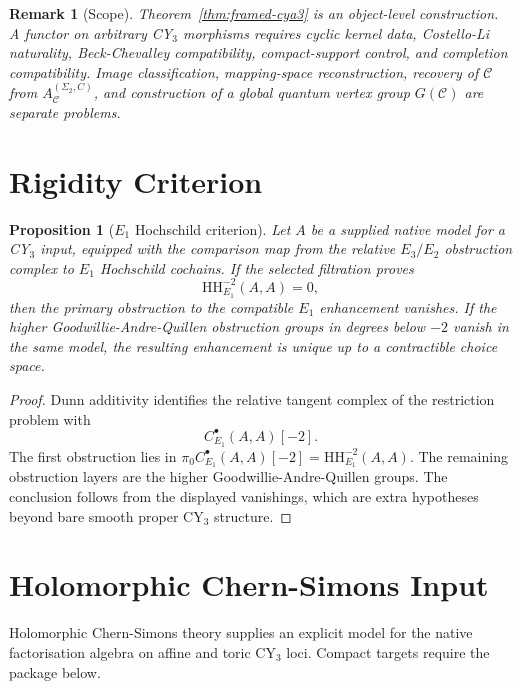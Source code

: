 \documentclass[11pt]{article}
\newtheorem{proposition}[theorem]{Proposition}
\newtheorem{remark}[theorem]{Remark}
\begin{document}
\begin{remark}[Scope]
\label{rem:scope}
Theorem~\ref{thm:framed-cya3} is an object-level construction.  A
functor on arbitrary CY$_3$ morphisms requires cyclic kernel data,
Costello-Li naturality, Beck-Chevalley compatibility, compact-support
control, and completion compatibility.  Image classification,
mapping-space reconstruction, recovery of $\mathcal C$ from
$A_{\mathcal C}^{(\Sigma_2,C)}$, and construction of a global quantum
vertex group $G(\mathcal C)$ are separate problems.
\end{remark}

\section{Rigidity Criterion}
\label{sec:rigidity}

\begin{proposition}[$E_1$ Hochschild criterion]
\label{prop:hh-minus-two}
Let $A$ be a supplied native model for a CY$_3$ input, equipped with
the comparison map from the relative $E_3/E_2$ obstruction complex to
$E_1$ Hochschild cochains.  If the selected filtration proves
\[
  \mathrm{HH}^{-2}_{E_1}(A,A)=0,
\]
then the primary obstruction to the compatible $E_1$ enhancement
vanishes.  If the higher Goodwillie-Andre-Quillen obstruction groups in
degrees below $-2$ vanish in the same model, the resulting enhancement
is unique up to a contractible choice space.
\end{proposition}

\begin{proof}
Dunn additivity identifies the relative tangent complex of the
restriction problem with
\[
  C^\bullet_{E_1}(A,A)[-2].
\]
The first obstruction lies in
$\pi_0 C^\bullet_{E_1}(A,A)[-2]=\mathrm{HH}^{-2}_{E_1}(A,A)$.  The
remaining obstruction layers are the higher Goodwillie-Andre-Quillen
groups.  The conclusion follows from the displayed vanishings, which
are extra hypotheses beyond bare smooth proper CY$_3$ structure.
\end{proof}

\section{Holomorphic Chern-Simons Input}
\label{sec:hcs}

Holomorphic Chern-Simons theory supplies an explicit model for
the native factorisation algebra on affine and toric CY$_3$ loci.
Compact targets require the package below.
\end{document}
